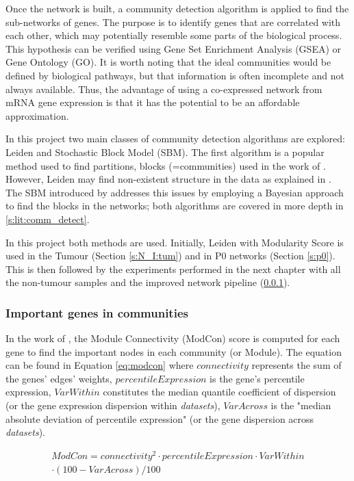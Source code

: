 Once the network is built, a community detection algorithm is applied to find the sub-networks of genes. The purpose is to identify genes that are correlated with each other, which may potentially resemble some parts of the biological process. This hypothesis can be verified using Gene Set Enrichment Analysis (GSEA) or Gene Ontology (GO). It is worth noting that the ideal communities would be defined by biological pathways, but that information is often incomplete and not always available. Thus, the advantage of using a co-expressed network from mRNA gene expression is that it has the potential to be an affordable approximation.


In this project two main classes of community detection algorithms are explored: Leiden and Stochastic Block Model (SBM). The first algorithm is a popular method used to find partitions, blocks (=communities) used in the work of \citet{Care2019-ij}. However, Leiden may find non-existent structure in the data as explained in \citet{Peixoto2021-jx}. The SBM introduced by \citet{Peixoto2019-fg} addresses this issues by employing a Bayesian approach to find the blocks in the networks; both algorithms are covered in more depth in \cref{s:lit:comm_detect}.

In this project both methods are used. Initially, Leiden with Modularity Score is used in the Tumour (Section \ref{s:N_I:tum}) and in P0 networks (Section \ref{s:p0}). This is then followed by the experiments performed in the next chapter with all the non-tumour samples and the improved network pipeline (\ref{}).

\subsubsection{Important genes in communities}

In the work of \citet{Care2019-ij}, the  Module Connectivity (ModCon) score is computed for each gene to find the important nodes in each community (or Module). The equation can be found in Equation \ref{eq:modcon} where $connectivity$ represents the sum of the genes' edges' weights, $percentileExpression$ is the gene's percentile expression, $VarWithin$ constitutes the median quantile coefficient of dispersion (or the gene expression dispersion within \textit{datasets}), $VarAcross$ is the "median absolute deviation of percentile expression" (or the gene dispersion across \textit{datasets}).

\begin{multline} \label{eq:modcon}
         ModCon = connectivity^2 \cdot percentileExpression \cdot VarWithin \\
         \cdot (100 - VarAcross) / 100
\end{multline}

